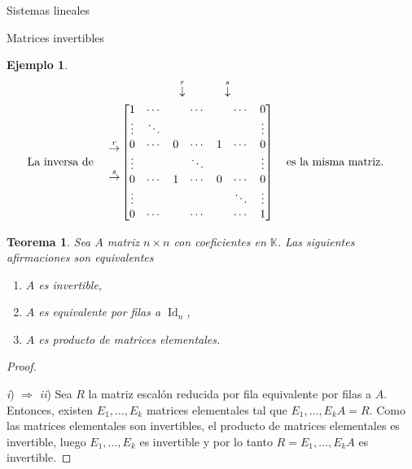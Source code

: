 \documentclass[a4paper,12pt,twoside,spanish,reqno]{amsbook}
\newtheorem{teorema}{Teorema}[section]
\theoremstyle{definition}
\newtheorem{ejemplo}{Ejemplo}[section]
\theoremstyle{remark}
\newcommand{\Id}{\operatorname{Id}}
\newcommand{\K}{\mathbb K}
\begin{document}
\begin{chapter}{Sistemas lineales}
\begin{section}{Matrices invertibles}
\begin{ejemplo}
			\begin{align*}
			&\begin{matrix}
			{}^{}&{}^{}&{}^{}&{}^{}&{}^{}&\overset{r}{\downarrow}&{}^{}&{}^{}&{}^{}{}^{}\overset{s}{\downarrow}&{}^{}
			\end{matrix} \\
			\text{La inversa de \quad}\begin{matrix}
			{}^{}\\{}^{}\\
			\overset{r}{\to}\\
			{}^{}\\
			\overset{s}{\to}\\{}^{}\\
			{}^{}
			\end{matrix}
			&\begin{bmatrix}
			1 & \cdots &  &\cdots &&\cdots& 0  \\
			\vdots  & \ddots  & & &&& \vdots \\
			0 & \cdots &0 &\cdots&1&\cdots &0 \\
			\vdots  &   & &\ddots &&& \vdots \\
			0  & \cdots  &1 &\cdots &0& \cdots& 0 \\
			\vdots  &   & & &&\ddots& \vdots \\
			0  & \cdots  & &\cdots &&\cdots& 1
			\end{bmatrix}
			\text{\quad es la misma matriz.\quad}
			\end{align*}
		
						
		
	
\end{ejemplo}
		
		
			
			
			\begin{teorema}\label{mtrx-inv-equiv} Sea $A$ matriz $n \times n$ con coeficientes en $\K$. Las siguientes afirmaciones son equivalentes
				\begin{enumerate}
					\item[\textit{i})] $A$ es invertible,
					\item[\textit{ii})] $A$  es equivalente por filas a $\Id_n$, 
					\item[\textit{iii})] $A$ es producto de matrices elementales.
				\end{enumerate}
			\end{teorema}
			\begin{proof}
				\

				
				\textit{i}) $\Rightarrow$ \textit{ii})\; Sea $R$ la matriz escalón reducida por fila equivalente por filas a $A$. Entonces,  existen $E_1,\ldots,E_k$ matrices elementales tal que $E_1,\ldots,E_kA = R$. Como las matrices elementales son invertibles, el producto de matrices elementales es invertible, luego  $E_1,\ldots,E_k$ es invertible y por lo tanto $R=E_1,\ldots,E_kA$ es invertible. 
				

\end{proof}
\end{section}
\end{chapter}
\end{document}
